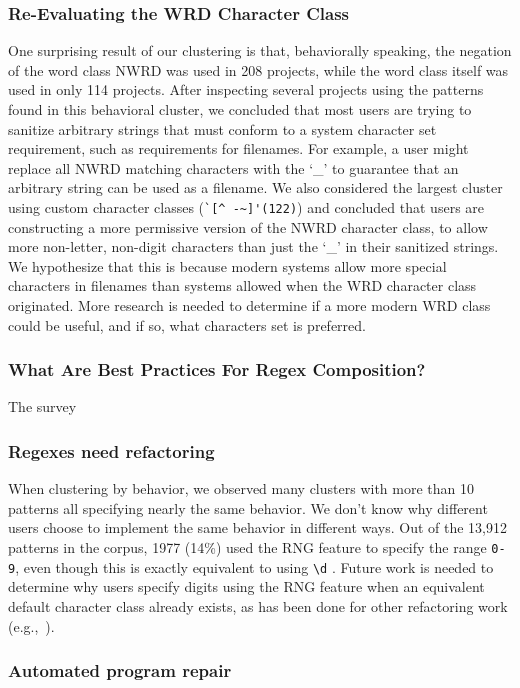\subsubsection{Re-Evaluating the WRD Character Class}
One surprising result of our clustering is that, behaviorally speaking, the negation of the word class NWRD was used in 208 projects, while the word class itself was used in only 114 projects. After inspecting several projects using the patterns found in this behavioral cluster, we concluded that most users are trying to sanitize arbitrary strings that must conform to a system character set requirement, such as requirements for filenames.  For example, a user might replace all NWRD matching characters with the `\_' to guarantee that an arbitrary string can be used as a filename.  We also considered the largest cluster using custom character classes (\verb?`[^ -~]'(122)?) and concluded that users are constructing a more permissive version of the NWRD character class, to allow more non-letter, non-digit characters than just the `\_' in their sanitized strings.  We hypothesize that this is because modern systems allow more special characters in filenames than systems allowed when the WRD character class originated.  More research is needed to determine if a more modern WRD class could be useful, and if so, what characters set is preferred.
\leavevmode\color{black}
\subsubsection{What Are Best Practices For Regex Composition?}
The survey
\leavevmode\color{gray}
\subsubsection{Regexes need refactoring}
When clustering by behavior, we observed many clusters with more than 10 patterns all specifying nearly the same behavior.  We don't know why different users choose to implement the same behavior in different ways.  Out of the 13,912 patterns in the corpus, 1977 (14\%) used the RNG feature to specify the range \verb?0-9?, even though this is exactly equivalent to using \verb?\d? .  Future work is needed to determine why users specify digits using the RNG feature when an equivalent default character class already exists, as has been done for other refactoring work (e.g.,~\cite{StoleeTSE2013}).
\leavevmode\color{black}
\subsubsection{Automated program repair}




